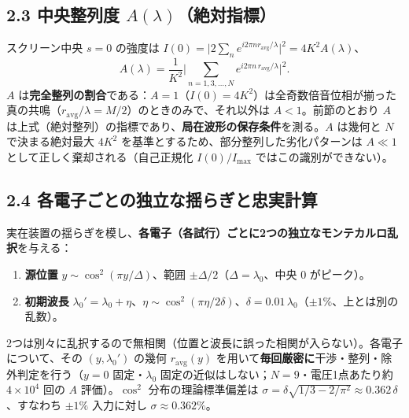 \documentclass[11pt,a4paper]{ltjsarticle}
\providecommand{\tightlist}{\setlength{\itemsep}{0pt}\setlength{\parskip}{0pt}}
\begin{document}
\subsection{\texorpdfstring{2.3 中央整列度
\(A(\lambda)\)（絶対指標）}{2.3 中央整列度 A(\textbackslash lambda)（絶対指標）}}\label{ux4e2dux592eux6574ux5217ux5ea6-alambdaux7d76ux5bfeux6307ux6a19}

スクリーン中央 \(s=0\) の強度は
\(I(0)=\big|2\sum_n e^{i2\pi n r_{\mathrm{avg}}/\lambda}\big|^2=4K^2A(\lambda)\)、
\[A(\lambda)=\frac{1}{K^2}\Big|\sum_{n=1,3,\dots,N}e^{i2\pi n\,r_{\mathrm{avg}}/\lambda}\Big|^2.\]
\(A\)
は\textbf{完全整列の割合}である：\(A=1\)（\(I(0)=4K^2\)）は全奇数倍音位相が揃った真の共鳴（\(r_{\mathrm{avg}}/\lambda=M/2\)）のときのみで、それ以外は
\(A<1\)。前節のとおり \(A\)
は上式（絶対整列）の指標であり、\textbf{局在波形の保存条件}を測る。\(A\)
は幾何と \(N\) で決まる絶対最大 \(4K^2\)
を基準とするため、部分整列した劣化パターンは \(A\ll1\)
として正しく棄却される（自己正規化 \(I(0)/I_{\max}\)
ではこの識別ができない）。

\subsection{2.4
各電子ごとの独立な揺らぎと忠実計算}\label{ux5404ux96fbux5b50ux3054ux3068ux306eux72ecux7acbux306aux63faux3089ux304eux3068ux5fe0ux5b9fux8a08ux7b97}

実在装置の揺らぎを模し、\textbf{各電子（各試行）ごとに2つの独立なモンテカルロ乱択}を与える：

\begin{enumerate}
\def\labelenumi{\arabic{enumi}.}
\tightlist
\item
  \textbf{源位置} \(y\sim\cos^2(\pi y/\Delta)\)、範囲
  \(\pm\Delta/2\)（\(\Delta=\lambda_0\)、中央 \(0\) がピーク）。
\item
  \textbf{初期波長}
  \(\lambda_0'=\lambda_0+\eta\)、\(\eta\sim\cos^2(\pi\eta/2\delta)\)、\(\delta=0.01\,\lambda_0\)（\(\pm1\%\)、上とは別の乱数）。
\end{enumerate}

2つは別々に乱択するので無相関（位置と波長に誤った相関が入らない）。各電子について、その
\((y,\lambda_0')\) の幾何 \(r_{\mathrm{avg}}(y)\)
を用いて\textbf{毎回厳密に}干渉・整列・除外判定を行う（\(y=0\)
固定・\(\lambda_0\) 固定の近似はしない；\(N=9\)・電圧1点あたり約
\(4\times10^4\) 回の \(A\) 評価）。\(\cos^2\) 分布の理論標準偏差は
\(\sigma=\delta\sqrt{1/3-2/\pi^2}\approx0.362\,\delta\)、すなわち
\(\pm1\%\) 入力に対し \textbf{\(\sigma\approx0.362\%\)}。
\end{document}
